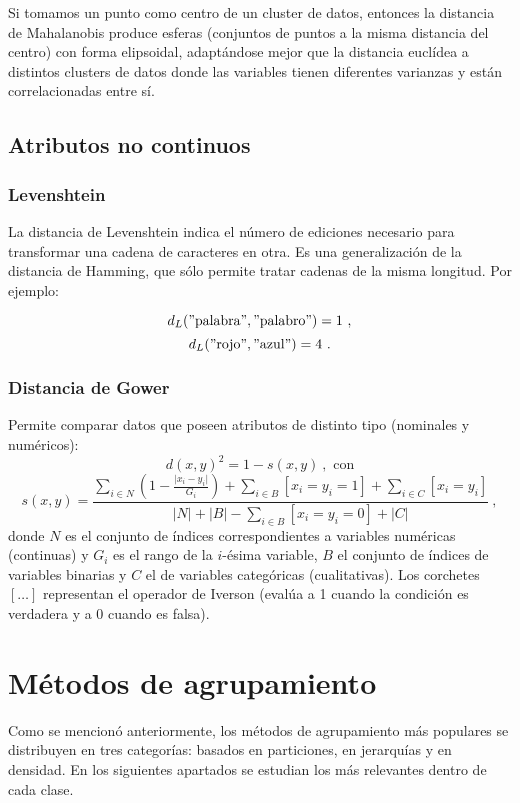 \documentclass[a4paper,11pt,spanish]{report}
\let\stdsection\section
\let\stdsub\subsection
\let\stdsubsub\subsubsection
\renewcommand{\chapter}{\stdsection}
\renewcommand{\section}{\stdsub}
\renewcommand{\subsection}{\stdsubsub}
\begin{document}
Si tomamos un punto como centro de un cluster de datos, entonces la distancia de Mahalanobis produce esferas (conjuntos de puntos a la misma distancia del centro) con forma elipsoidal, adaptándose mejor que la distancia euclídea a distintos clusters de datos donde las variables tienen diferentes varianzas y están correlacionadas entre sí.

\section{Atributos no continuos}
\label{sec-1-2-4}

\subsection*{Levenshtein}
\label{sec-1-2-4-1}

La distancia de Levenshtein indica el número de ediciones necesario para transformar una cadena de caracteres en otra. Es una generalización de la distancia de Hamming, que sólo permite tratar cadenas de la misma longitud. Por ejemplo:

$$d_L("\text{palabra}", "\text{palabro}") = 1~,$$
$$d_L("\text{rojo}", "\text{azul}") = 4~.$$

\subsection*{Distancia de Gower}
\label{sec-1-2-4-2}

Permite comparar datos que poseen atributos de distinto tipo (nominales y numéricos):
$$d(x,y)^2=1-s(x,y)~,\text{ con}$$
\[s(x,y)=\frac{\sum\limits_{i \in N} \left(1 - \frac{\lvert x_i - y_i\rvert}{G_i}\right)+\sum\limits_{i \in B}[x_i = y_i = 1]+\sum\limits_{i \in C}[x_i = y_i]}{\lvert N \rvert + \lvert B \rvert - \sum\limits_{i \in B}[x_i = y_i = 0] + \lvert C \rvert}~,\]
donde $N$ es el conjunto de índices correspondientes a variables numéricas (continuas) y $G_i$ es el rango de la $i$-ésima variable, $B$ el conjunto de índices de variables binarias y $C$ el de variables categóricas (cualitativas). Los corchetes $[\dots]$ representan el operador de Iverson (evalúa a 1 cuando la condición es verdadera y a 0 cuando es falsa).


\chapter{Métodos de agrupamiento}
\label{sec-1-3}

Como se mencionó anteriormente, los métodos de agrupamiento más populares se distribuyen en tres categorías: basados en particiones, en jerarquías y en densidad. En los siguientes apartados se estudian los más relevantes dentro de cada clase.
\end{document}

